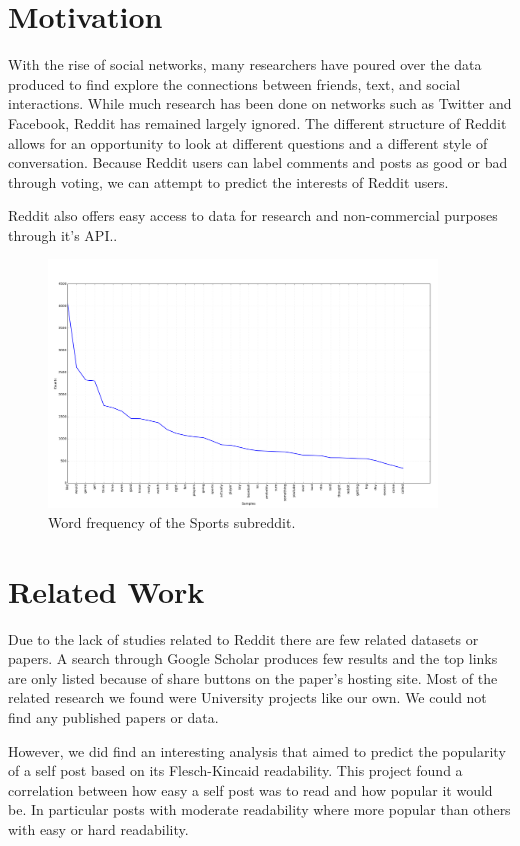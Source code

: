 \documentclass[10pt,twocolumn]{article}
\begin{document}
\section{Motivation}
With the rise of social networks, many researchers have poured over the data produced to find explore the connections between friends, text, and social interactions. While much research has been done on networks such as Twitter and Facebook, Reddit has remained largely ignored. The different structure of Reddit allows for an opportunity to look at different questions and a different style of conversation. Because Reddit users can label comments and posts as good or bad through voting, we can attempt to predict the interests of Reddit users.

Reddit also offers easy access to data for research and non-commercial purposes through it's API.\cite{Reddit}. 

\begin{figure}
    \centering
  	\includegraphics[width=0.92\textwidth]{./sports_freq.png}
  	\caption{Word frequency of the Sports subreddit.}
  	\label{sports}
\end{figure}

\section{Related Work}

Due to the lack of studies related to Reddit there are few related datasets or papers. A search through Google Scholar produces few results and the top links are only listed because of share buttons on the paper's hosting site. Most of the related research we found were University projects like our own. We could not find any published papers or data.

However, we did find an interesting analysis that aimed to predict the popularity of a self post based on its Flesch-Kincaid\cite{flesch1949art} readability. This project found a correlation between how easy a self post was to read and how popular it would be. In particular posts with moderate readability where more popular than others with easy or hard readability.
\end{document}
